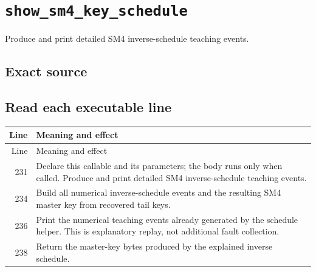\section{\texttt{show\_sm4\_key\_schedule}}
Produce and print detailed SM4 inverse-schedule teaching events.
\begin{center}\end{center}
\subsection*{Exact source}
\subsection*{Read each executable line}
\begingroup\small\begin{longtable}{r >{\raggedright\arraybackslash}p{138mm}}\toprule Line&Meaning and effect\\\midrule\endfirsthead\toprule Line&Meaning and effect\\\midrule\endhead
231&Declare this callable and its parameters; the body runs only when called. Produce and print detailed SM4 inverse-schedule teaching events.\\
234&Build all numerical inverse-schedule events and the resulting SM4 master key from recovered tail keys.\\
236&Print the numerical teaching events already generated by the schedule helper. This is explanatory replay, not additional fault collection.\\
238&Return the master-key bytes produced by the explained inverse schedule.\\
\bottomrule\end{longtable}\endgroup
